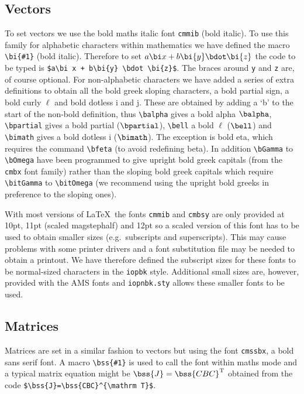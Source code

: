 \subsection{Vectors}
To set vectors we use the bold maths italic font  \verb"cmmib"
(bold italic). 
To use this family for alphabetic 
characters within mathematics we have defined the
macro \verb"\bi{#1}" (bold italic). Therefore to set 
$a\bi x + b\bi{y} \bdot \bi{z}$ 
the code to be typed is \verb"$a\bi x + b\bi{y} \bdot \bi{z}$".
The braces around \verb"y" and \verb"z" are, of course optional.
For non-alphabetic characters we have added a series of extra 
definitions to obtain all the bold greek sloping characters,
a bold partial sign, a bold curly  $\ell$
and bold dotless i and j. These are obtained by 
adding a `b' to the start of the non-bold definition, thus \verb"\balpha" 
gives a bold alpha $\balpha$, \verb"\bpartial" gives a bold partial 
($\bpartial$), \verb"\bell" a bold $\ell$ ($\bell$) and 
\verb"\bimath" gives a bold dotless i ($\bimath$).  
The exception is bold eta, which requires the command \verb"\bfeta" (to 
avoid redefining beta). In addition \verb"\bGamma" to \verb"\bOmega" 
have been programmed to give upright bold greek capitals 
(from the \verb"cmbx" font family) 
rather than the sloping bold greek capitals which require \verb"\bitGamma"
to \verb"\bitOmega" (we recommend using the upright bold greeks in 
preference to the sloping ones). 

With most versions of \LaTeX\ the fonts \verb"cmmib" and \verb"cmbsy"
are only provided at 10pt, 
11pt (scaled magstephalf) and 12pt so a scaled version of this
font has to be used to obtain smaller sizes (e.g.\ subscripts and
superscripts). This may cause problems with some printer drivers and
a font substitution file may be needed to obtain a printout. We have
therefore defined the subscript sizes for these fonts to be normal-sized
characters in the \verb"iopbk" style.
Additional small sizes are, however, 
provided with the AMS fonts and \verb"iopnbk.sty" 
allows these smaller fonts
to be used. 

\subsection{Matrices}
Matrices are set in a similar fashion to vectors but using the font 
\verb"cmssbx", a bold sans serif font. 
A macro \verb"\bss{#1}"
is used to call the font within maths mode and a typical matrix 
equation might be $\bss{J}=\bss{CBC}^{\mathrm T}$ obtained from the code 
\verb"$\bss{J}=\bss{CBC}^{\mathrm T}$".


